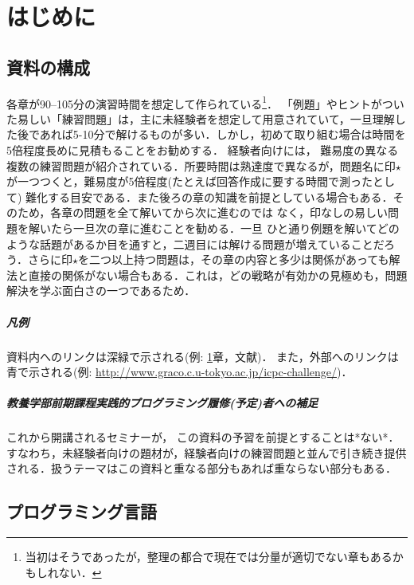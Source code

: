 \chapter{はじめに}\label{chapter:introduction}

\section{資料の構成}

各章が90--105分の演習時間を想定して作られている\footnote{当初はそうであったが，整理の都合で現在では分量が適切でない章もあるかもしれない．}．
「例題」やヒントがついた易しい「練習問題」は，主に未経験者を想定して用意されていて，一旦理解した後であれば5-10分で解けるものが多い．しかし，初めて取り組む場合は時間を5倍程度長めに見積もることをお勧めする．
経験者向けには，
難易度の異なる複数の練習問題が紹介されている．所要時間は熟達度で異なるが，問題名に印$\star{}$が一つつくと，難易度が5倍程度(たとえば回答作成に要する時間で測ったとして)
難化する目安である．また後ろの章の知識を前提としている場合もある．そのため，各章の問題を全て解いてから次に進むのでは
なく，印なしの易しい問題を解いたら一旦次の章に進むことを勧める．一旦
ひと通り例題を解いてどのような話題があるか目を通すと，二週目には解ける問題が増えていることだろう．さらに印$\star{}$を二つ以上持つ問題は，その章の内容と多少は関係があっても解法と直接の関係がない場合もある．これは，どの戦略が有効かの見極めも，問題解決を学ぶ面白さの一つであるため．

\paragraph{凡例}
資料内へのリンクは深緑で示される(例: \ref{chapter:introduction}章，文献\cite{book:pcc})．
また，外部へのリンクは青で示される(例: \url{http://www.graco.c.u-tokyo.ac.jp/icpc-challenge/})．

\paragraph{教養学部前期課程実践的プログラミング履修(予定)者への補足} これから開講されるセミナーが，
この資料の予習を前提とすることは*ない*． すなわち，未経験者向けの題材が，経験者向けの練習問題と並んで引き続き提供される．扱うテーマはこの資料と重なる部分もあれば重ならない部分もある．

\section{プログラミング言語}

